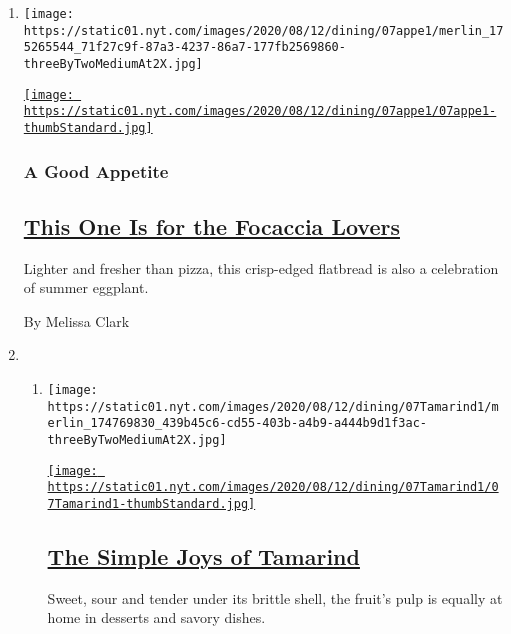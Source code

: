 \begin{enumerate}
\def\labelenumi{\arabic{enumi}.}
\item
  \texttt{[image: https://static01.nyt.com/images/2020/08/12/dining/07appe1/merlin\_175265544\_71f27c9f-87a3-4237-86a7-177fb2569860-threeByTwoMediumAt2X.jpg]}

  \href{/2020/08/07/dining/eggplant-focaccia-recipe.html}{\texttt{[image: https://static01.nyt.com/images/2020/08/12/dining/07appe1/07appe1-thumbStandard.jpg]}}

  \hypertarget{a-good-appetite}{%
  \subsubsection{A Good Appetite}\label{a-good-appetite}}

  \hypertarget{this-one-is-for-the-focaccia-lovers}{%
  \subsection{\texorpdfstring{\href{/2020/08/07/dining/eggplant-focaccia-recipe.html}{This
  One Is for the Focaccia
  Lovers}}{This One Is for the Focaccia Lovers}}\label{this-one-is-for-the-focaccia-lovers}}

  Lighter and fresher than pizza, this crisp-edged flatbread is also a
  celebration of summer eggplant.

  By Melissa Clark
\item
  \begin{enumerate}
  \def\labelenumii{\arabic{enumii}.}
  \item
    \texttt{[image: https://static01.nyt.com/images/2020/08/12/dining/07Tamarind1/merlin\_174769830\_439b45c6-cd55-403b-a4b9-a444b9d1f3ac-threeByTwoMediumAt2X.jpg]}

    \href{/2020/08/07/dining/tamarind-recipes.html}{\texttt{[image: https://static01.nyt.com/images/2020/08/12/dining/07Tamarind1/07Tamarind1-thumbStandard.jpg]}}

    \hypertarget{the-simple-joys-of-tamarind}{%
    \subsection{\texorpdfstring{\href{/2020/08/07/dining/tamarind-recipes.html}{The
    Simple Joys of
    Tamarind}}{The Simple Joys of Tamarind}}\label{the-simple-joys-of-tamarind}}

    Sweet, sour and tender under its brittle shell, the fruit's pulp is
    equally at home in desserts and savory dishes.


\end{enumerate}
\end{enumerate}

